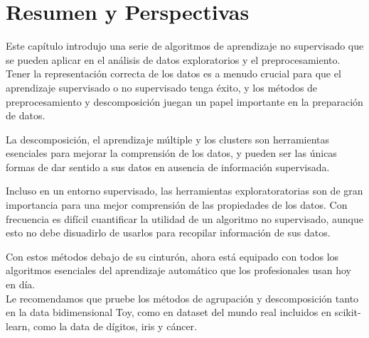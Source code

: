 \section{Resumen y Perspectivas}

 Este capítulo introdujo una serie de algoritmos de aprendizaje  no supervisado que se pueden aplicar en el análisis de datos exploratorios y el preprocesamiento. Tener la representación correcta de los datos es a menudo crucial para que el aprendizaje supervisado o no supervisado tenga éxito, y los métodos de preprocesamiento y descomposición juegan un papel importante en la preparación de datos.



La descomposición, el aprendizaje múltiple y los clusters son herramientas esenciales para mejorar la comprensión de los datos, y  pueden ser las únicas formas de dar sentido a sus datos en
 ausencia de información  supervisada. 
 
 




\noindent Incluso en un entorno supervisado, las herramientas  exploratoratorias son de gran importancia  para una mejor comprensión de las propiedades de los datos. 
 Con frecuencia es difícil  cuantificar  la utilidad de un algoritmo no supervisado, aunque esto no debe  disuadirlo de usarlos para recopilar información de sus datos.

Con estos métodos debajo de su cinturón, ahora está equipado con todos los algoritmos esenciales   del aprendizaje automático que los profesionales  usan hoy en  día.\\

 


Le recomendamos que pruebe los métodos de agrupación y descomposición tanto en la data   bidimensional  Toy,  como en dataset del mundo real incluidos en scikit-learn, como la data de dígitos, iris y   cáncer.\\


				
				

\newpage

